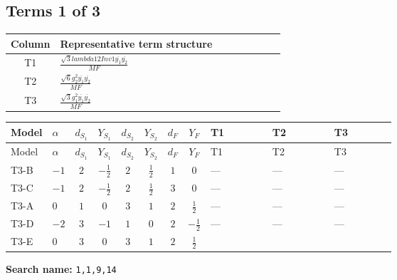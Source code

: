 \documentclass[8pt]{article}
\begin{document}
\begin{landscape}
\subsection*{Terms 1 of 3}
\begin{center}
\begin{tabular}{@{}c >{\raggedright\arraybackslash}p{0.82\linewidth}@{}}
\toprule
Column & Representative term structure \\
\midrule
T1 & \(\displaystyle \frac{\sqrt{3} lambda12Inv1 \overline{y_{1}} \overline{y_{2}}}{MF}\) \\
\midrule
T2 & \(\displaystyle \frac{\sqrt{6} g_{2}^{2} \overline{y_{1}} \overline{y_{2}}}{MF}\) \\
\midrule
T3 & \(\displaystyle \frac{\sqrt{3} g_{1}^{2} \overline{y_{1}} \overline{y_{2}}}{MF}\) \\
\midrule
\bottomrule
\end{tabular}
\end{center}
\smallskip
\tiny
\begin{longtable}{@{}llcccccc >{\raggedright\arraybackslash}p{0.21\linewidth} >{\raggedright\arraybackslash}p{0.21\linewidth} >{\raggedright\arraybackslash}p{0.21\linewidth}@{}}
\toprule
Model & $\alpha$ & $d_{S_1}$ & $Y_{S_1}$ & $d_{S_2}$ & $Y_{S_2}$ & $d_F$ & $Y_F$ & T1 & T2 & T3 \\
\midrule
\endfirsthead
\toprule
Model & $\alpha$ & $d_{S_1}$ & $Y_{S_1}$ & $d_{S_2}$ & $Y_{S_2}$ & $d_F$ & $Y_F$ & T1 & T2 & T3 \\
\midrule
\endhead
T3-B & $-1$ & $2$ & $-\frac{1}{2}$ & $2$ & $\frac{1}{2}$ & $1$ & $0$ & --- & --- & --- \\
\midrule
T3-C & $-1$ & $2$ & $-\frac{1}{2}$ & $2$ & $\frac{1}{2}$ & $3$ & $0$ & --- & --- & --- \\
\midrule
T3-A & $0$ & $1$ & $0$ & $3$ & $1$ & $2$ & $\frac{1}{2}$ & --- & --- & --- \\
\midrule
T3-D & $-2$ & $3$ & $-1$ & $1$ & $0$ & $2$ & $-\frac{1}{2}$ & --- & --- & --- \\
\midrule
T3-E & $0$ & $3$ & $0$ & $3$ & $1$ & $2$ & $\frac{1}{2}$ & \scriptsize\adjustbox{max width=\linewidth}{$\begin{gathered} - \frac{\sqrt{3} lambda12Inv1 \overline{y_{1}} \overline{y_{2}}}{6 MF}\end{gathered}$} & \scriptsize\adjustbox{max width=\linewidth}{$\begin{gathered} \frac{\sqrt{6} g_{2}^{2} \overline{y_{1}} \overline{y_{2}}}{3 MF}\end{gathered}$} & \scriptsize\adjustbox{max width=\linewidth}{$\begin{gathered} \frac{\sqrt{3} g_{1}^{2} \overline{y_{1}} \overline{y_{2}}}{8 MF}\end{gathered}$} \\
\midrule
\bottomrule
\end{longtable}
\clearpage
\noindent\textbf{Search name: }\texttt{1,1,9,14}\par\smallskip

\end{landscape}
\end{document}
